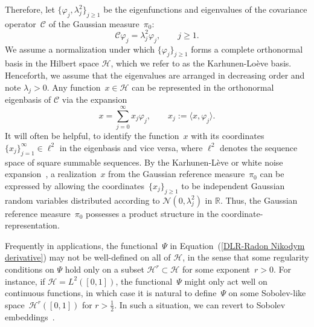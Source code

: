 Therefore, let $\{ \varphi_j, \lambda_j^2 \}_{j \geq 1}$ be the eigenfunctions and eigenvalues of the covariance operator~$\mathcal{C}$ of the Gaussian measure~$\pi_0$:
\begin{equation}
\label{DLR-Setting: Eigefunctions}
 \mathcal{C} \varphi_j = \lambda_j^2 \varphi_j, \qquad j \geq 1. 
\end{equation}
We assume a normalization under which $\{ \varphi_j \}_{j \geq 1}$ forms a complete orthonormal basis in the Hilbert space $\mathcal{H}$, which we refer to as the Karhunen-Lo\`{e}ve basis. Henceforth, we assume that the eigenvalues are arranged in decreasing order and note $\lambda_j > 0$. Any function~$x \in \mathcal{H}$ can be represented in the orthonormal eigenbasis of $\mathcal{C}$ via the expansion
\begin{equation}
\label{DLR-Setting: karhunen-loeve representation}
 x = \sum_{j = 0}^{\infty} x_j \varphi_j, \qquad x_j := \langle x, \varphi_j \rangle.
\end{equation}
It will often be helpful, to identify the function~$x$ with its coordinates~$\{ x_j \}_{j=1}^{\infty} \in \ell^2$ in the eigenbasis and vice versa, where $\ell^2$ denotes the sequence space of square summable sequences. By the Karhunen-L\`{e}ve or white noise expansion~\autocite[Section 2.2.3]{DaPrato1992}, a realization~$x$ from the Gaussian reference measure~$\pi_0$ can be expressed by allowing the coordinates~$\{x_j\}_{j \geq 1}$ to be independent Gaussian random variables distributed according to $\mathcal{N}(0, \lambda_j^2)$ in $\mathbb{R}$. Thus, the Gaussian reference measure~$\pi_0$ possesses a product structure in the coordinate-representation.


Frequently in applications, the functional~$\Psi$ in Equation~(\ref{DLR-Radon Nikodym derivative}) may not be well-defined on all of $\mathcal{H}$, in the sense that some regularity conditions on $\Psi$ hold only on a subset $\mathcal{H}^r \subset \mathcal{H}$ for some exponent~$r > 0$. For instance, if $ \mathcal{H}= L^2([0,1]) $, the functional~$\Psi$ might only act well on continuous functions, in which case it is natural to define~$\Psi$ on some Sobolev-like space~$\mathcal{H}^r([0,1])$ for $r > \tfrac{1}{2}$. In such a situation, we can revert to  Sobolev embeddings~\autocite[Theorem 6.3]{Hairer2009}.


